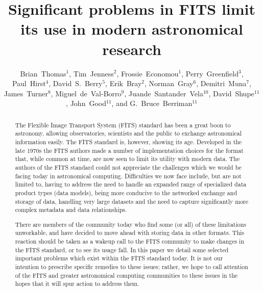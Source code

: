 \documentclass[11pt,twoside]{article}
\begin{document}
\title{Significant problems in FITS limit its use in modern astronomical research}
\author{Brian~Thomas$^1$, Tim~Jenness$^2$, Frossie~Economou$^1$, Perry~Greenfield$^3$,
Paul~Hirst$^4$, 
David~S.~Berry$^5$, Erik~Bray$^2$,
Norman~Gray$^6$, Demitri~Muna$^7$, James~Turner$^8$,
Miguel~de~Val-Borro$^9$, Juande~Santander~Vela$^{10}$,
David~Shupe$^{11}$, John~Good$^{11}$, and G.~Bruce~Berriman$^{11}$
}

\begin{abstract}
  The Flexible Image Transport System (FITS) standard has been a great
  boon to astronomy, allowing observatories, scientists and the public
  to exchange astronomical information easily. The FITS standard is,
  however, showing its age. Developed in the late 1970s the FITS
  authors made a number of implementation choices for the format that,
  while common at time, are now seen to limit its utility with modern
  data. The authors of the FITS standard could not appreciate the
  challenges which we would be facing today in astronomical
  computing. Difficulties we now face include, but are not limited to,
  having to address the need to handle an expanded range of
  specialized data product types (data models), being more conducive
  to the networked exchange and storage of data, handling very large
  datasets and the need to capture significantly more complex metadata
  and data relationships.

  There are members of the community today who find some (or all) of
  these limitations unworkable, and have decided to move ahead with
  storing data in other formats. This reaction should be taken as a
  wakeup call to the FITS community to make changes in the FITS
  standard, or to see its usage fall. In this paper we detail some
  selected important problems which exist within the FITS standard
  today.  It is not our intention to prescribe specific remedies to
  these issues; rather, we hope to call attention of the FITS and
  greater astronomical computing communities to these issues in the
  hopes that it will spur action to address them.
\end{abstract}
\end{document}
